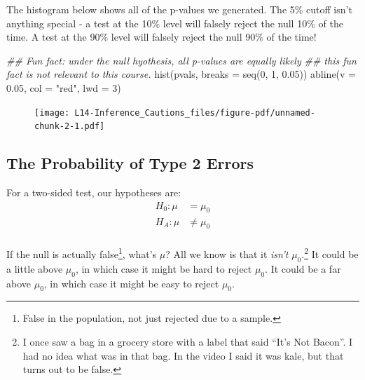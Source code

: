 \documentclass[
  letterpaper,
  DIV=11,
  numbers=noendperiod,
  oneside]{scrreprt}
\newenvironment{Shaded}{\begin{snugshade}}{\end{snugshade}}
\newcommand{\AttributeTok}[1]{\textcolor[rgb]{0.40,0.45,0.13}{#1}}
\newcommand{\DecValTok}[1]{\textcolor[rgb]{0.68,0.00,0.00}{#1}}
\newcommand{\DocumentationTok}[1]{\textcolor[rgb]{0.37,0.37,0.37}{\textit{#1}}}
\newcommand{\FloatTok}[1]{\textcolor[rgb]{0.68,0.00,0.00}{#1}}
\newcommand{\FunctionTok}[1]{\textcolor[rgb]{0.28,0.35,0.67}{#1}}
\newcommand{\NormalTok}[1]{\textcolor[rgb]{0.00,0.23,0.31}{#1}}
\newcommand{\StringTok}[1]{\textcolor[rgb]{0.13,0.47,0.30}{#1}}
\begin{document}
The histogram below shows all of the p-values we generated. The 5\%
cutoff isn't anything special - a test at the 10\% level will falsely
reject the null 10\% of the time. A test at the 90\% level will falsely
reject the null 90\% of the time!

\begin{Shaded}
\begin{Highlighting}[]
\DocumentationTok{\#\# Fun fact: under the null hyothesis, all p{-}values are equally likely}
\DocumentationTok{\#\# this fun fact is not relevant to this course.}
\FunctionTok{hist}\NormalTok{(pvals, }\AttributeTok{breaks =} \FunctionTok{seq}\NormalTok{(}\DecValTok{0}\NormalTok{, }\DecValTok{1}\NormalTok{, }\FloatTok{0.05}\NormalTok{))}
\FunctionTok{abline}\NormalTok{(}\AttributeTok{v =} \FloatTok{0.05}\NormalTok{, }\AttributeTok{col =} \StringTok{"red"}\NormalTok{, }\AttributeTok{lwd =} \DecValTok{3}\NormalTok{)}
\end{Highlighting}
\end{Shaded}

\begin{figure}[H]

{\centering \texttt{[image: L14-Inference\_Cautions\_files/figure-pdf/unnamed-chunk-2-1.pdf]}

}

\end{figure}

\hypertarget{the-probability-of-type-2-errors}{%
\subsection{The Probability of Type 2
Errors}\label{the-probability-of-type-2-errors}}

For a two-sided test, our hypotheses are: \begin{align*}
H_0: \mu &= \mu_0\\
H_A: \mu &\ne \mu_0\\
\end{align*}

If the null is actually false\footnote{False in the population, not just
  rejected due to a sample.}, what's \(\mu\)? All we know is that it
\emph{isn't} \(\mu_0\).\footnote{I once saw a bag in a grocery store
  with a label that said ``It's Not Bacon''. I had no idea what was in
  that bag. In the video I said it was kale, but that turns out to be
  false.} It could be a little above \(\mu_0\), in which case it might
be hard to reject \(\mu_0\). It could be a far above \(\mu_0\), in which
case it might be easy to reject \(\mu_0\).
\end{document}
